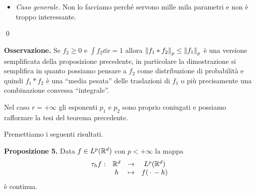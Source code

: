 \begin{itemize}

	\item
		\textit{Caso generale.} Non lo facciamo perché servono mille mila parametri e non è troppo interessante.
\end{itemize}
\qed

\textbf{Osservazione.} Se $f_2 \geq 0$ e $\int f_2 \dd x = 1$ allora $\left\lVert f_1 \ast f_2 \right\rVert_p \leq \left\lVert f_1 \right\rVert_p$ è una versione semplificata della proposizione precedente, in particolare la dimostrazione si semplifica in quanto possiamo pensare a $f_2$ come distribuzione di probabilità e quindi $f_1 \ast f_2$ è una ``media pesata'' delle traslazioni di $f_1$ o più precisamente una combinazione convessa ``integrale''.

Nel caso $r = +\infty$ gli esponenti $p_1$ e $p_2$ sono proprio coniugati e possiamo rafforzare la tesi del teorema precedente.


Premettiamo i seguenti risultati.

\textbf{Proposizione 5.}
Data $f \in L^p(\mathbb R^d)$ con $p < +\infty$ la mappa
$$
\begin{array}{cccc}
	\tau_h f : & \mathbb R^d & \to & L^p(\mathbb R^d) \\
	& h & \mapsto & f(\,\cdot\, - h)
\end{array}
$$
è continua.

